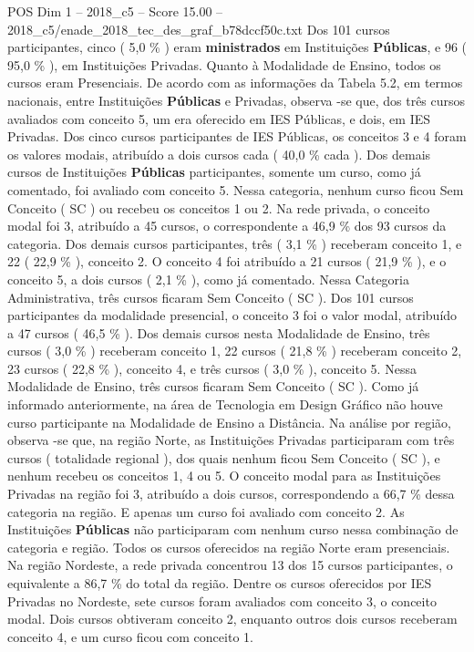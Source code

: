 \begin{textsample}{POS Dim 1 – 2018\_c5 – Score 15.00 – 2018\_c5/enade\_2018\_tec\_des\_graf\_b78dccf50c.txt}
Dos 101 cursos participantes, cinco ( 5,0 \% ) eram \textbf{ministrados} em Instituições \textbf{Públicas}, e 96 ( 95,0 \% ), em Instituições Privadas.
Quanto à Modalidade de Ensino, todos os cursos eram Presenciais.
De acordo com as informações da Tabela 5.2, em termos nacionais, entre Instituições \textbf{Públicas} e Privadas, observa -se que, dos três cursos avaliados com conceito 5, um era oferecido em IES Públicas, e dois, em IES Privadas.
Dos cinco cursos participantes de IES Públicas, os conceitos 3 e 4 foram os valores modais, atribuído a dois cursos cada ( 40,0 \% cada ).
Dos demais cursos de Instituições \textbf{Públicas} participantes, somente um curso, como já comentado, foi avaliado com conceito 5.
Nessa categoria, nenhum curso ficou Sem Conceito ( SC ) ou recebeu os conceitos 1 ou 2.
Na rede privada, o conceito modal foi 3, atribuído a 45 cursos, o correspondente a 46,9 \% dos 93 cursos da categoria.
Dos demais cursos participantes, três ( 3,1 \% ) receberam conceito 1, e 22 ( 22,9 \% ), conceito 2.
O conceito 4 foi atribuído a 21 cursos ( 21,9 \% ), e o conceito 5, a dois cursos ( 2,1 \% ), como já comentado.
Nessa Categoria Administrativa, três cursos ficaram Sem Conceito ( SC ).
Dos 101 cursos participantes da modalidade presencial, o conceito 3 foi o valor modal, atribuído a 47 cursos ( 46,5 \% ).
Dos demais cursos nesta Modalidade de Ensino, três cursos ( 3,0 \% ) receberam conceito 1, 22 cursos ( 21,8 \% ) receberam conceito 2, 23 cursos ( 22,8 \% ), conceito 4, e três cursos ( 3,0 \% ), conceito 5.
Nessa Modalidade de Ensino, três cursos ficaram Sem Conceito ( SC ).
Como já informado anteriormente, na área de Tecnologia em Design Gráfico não houve curso participante na Modalidade de Ensino a Distância.
Na análise por região, observa -se que, na região Norte, as Instituições Privadas participaram com três cursos ( totalidade regional ), dos quais nenhum ficou Sem Conceito ( SC ), e nenhum recebeu os conceitos 1, 4 ou 5.
O conceito modal para as Instituições Privadas na região foi 3, atribuído a dois cursos, correspondendo a 66,7 \% dessa categoria na região.
E apenas um curso foi avaliado com conceito 2.
As Instituições \textbf{Públicas} não participaram com nenhum curso nessa combinação de categoria e região.
Todos os cursos oferecidos na região Norte eram presenciais.
Na região Nordeste, a rede privada concentrou 13 dos 15 cursos participantes, o equivalente a 86,7 \% do total da região.
Dentre os cursos oferecidos por IES Privadas no Nordeste, sete cursos foram avaliados com conceito 3, o conceito modal.
Dois cursos obtiveram conceito 2, enquanto outros dois cursos receberam conceito 4, e um curso ficou com conceito 1.

\end{textsample}
